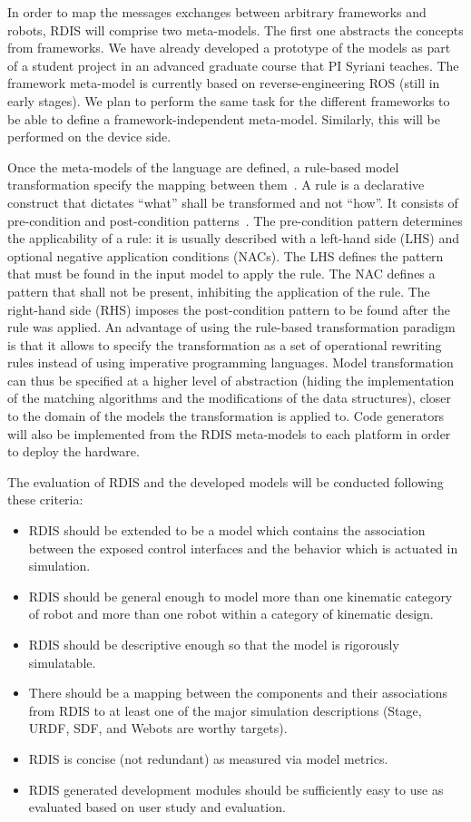 In order to map the messages exchanges between arbitrary frameworks and robots, RDIS will comprise two meta-models.
The first one abstracts the concepts from frameworks.
We have already developed a prototype of the models as part of a student project in an advanced graduate course that PI Syriani teaches.
The framework meta-model is currently based on reverse-engineering ROS (still in early stages).
We plan to perform the same task for the different frameworks to be able to define a framework-independent meta-model.
Similarly, this will be performed on the device side.

Once the meta-models of the language are defined, a rule-based model transformation specify the mapping between them~\cite{Jouault2008}.
A rule is a declarative construct that dictates ``what'' shall be transformed and not ``how''.
It consists of pre-condition and post-condition patterns~\cite{Ehrig2006}.
The pre-condition pattern determines the applicability of a rule: it is usually described with a left-hand side (LHS) and optional negative application conditions (NACs).
The LHS defines the pattern that must be found in the input model to apply the rule.
The NAC defines a pattern that shall not be present, inhibiting the application of the rule.
The right-hand side (RHS) imposes the post-condition pattern to be found after the rule was applied.
An advantage of using the rule-based transformation paradigm is that it allows to specify the transformation as a set of operational rewriting rules instead of using imperative programming languages.
Model transformation can thus be specified at a higher level of abstraction (hiding the implementation of the matching algorithms and the modifications of the data structures), closer to the domain of the models the transformation is applied to.
Code generators will also be implemented from the RDIS meta-models to each platform in order to deploy the hardware.

The evaluation of RDIS and the developed models will be conducted following these criteria:
\vspace{-.5\baselineskip}%
\begin{itemize}
  \item RDIS should be extended to be a model which contains the association between the exposed control interfaces and the behavior which is actuated in
  simulation.
  \item RDIS should be general enough to model more than one kinematic category of robot and more than one robot within a category of kinematic design.
  \item RDIS should be descriptive enough so that the model is rigorously simulatable.
  \item There should be a mapping between the components and their associations from RDIS to at least one of the major simulation descriptions (Stage, URDF, SDF, and Webots are worthy targets).
  \item RDIS is concise (not redundant) as measured via model metrics.
  \item RDIS generated development modules should be sufficiently easy to use as evaluated based on user study and evaluation.
\end{itemize}

